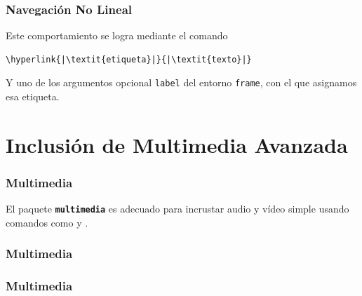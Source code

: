\documentclass[12pt,aspectratio=169,ignorenonframetext]{ltxbeamer}
\begin{document}
\begin{frame}[fragile]
\frametitle{Navegación No Lineal}

Este comportamiento se logra mediante el comando

\begin{verbatim}
\hyperlink{|\textit{etiqueta}|}{|\textit{texto}|}
\end{verbatim}

Y uno de los argumentos opcional \texttt{label} del entorno \texttt{frame}, con el que asignamos esa etiqueta.
\end{frame}





\section{Inclusión de Multimedia Avanzada}

\begin{frame}
\frametitle{Multimedia}

El paquete \textbf{\texttt{multimedia}} es adecuado para incrustar audio y vídeo simple usando comandos como \texttt{\sound} y \texttt{\movie}.
\end{frame}



\begin{frame}
\frametitle{Multimedia}

\texttt{}
\end{frame}










\begin{frame}
\frametitle{Multimedia}

\begin{center}
\end{center}
\end{frame}
\end{document}
